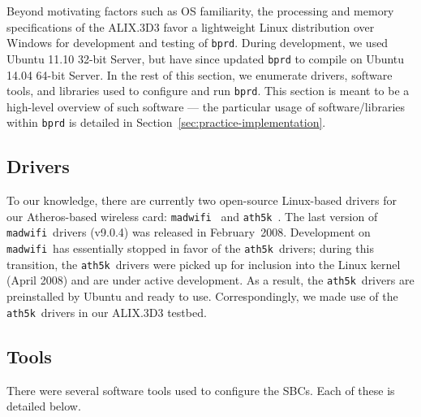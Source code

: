 \documentclass{article}
\newcommand{\athfivek}{\texttt{ath5k}}
\newcommand{\bprd}{\texttt{bprd}\xspace}
\newcommand{\madwifi}{\texttt{madwifi}}
\begin{document}
Beyond motivating factors such as OS familiarity, the processing and memory specifications of the ALIX.3D3 favor a lightweight Linux distribution over Windows for development and testing of \bprd.
During development, we used Ubuntu 11.10 32-bit Server, but have since updated \bprd to compile on Ubuntu 14.04 64-bit Server.
In the rest of this section, we enumerate drivers, software tools, and libraries used to configure and run \bprd.
This section is meant to be a high-level overview of such software --- the particular usage of software/libraries within \bprd is detailed in Section~\ref{sec:practice-implementation}.


\subsection{Drivers}\label{sec:drivers}

To our knowledge, there are currently two open-source Linux-based drivers for our Atheros-based wireless card: \madwifi\ \cite{madwifi} and \athfivek\ \cite{ath5k}.
The last version of \madwifi\ drivers (v9.0.4) was released in February~2008.
Development on \madwifi\ has essentially stopped in favor of the \athfivek\ drivers; during this transition, the \athfivek\ drivers were picked up for inclusion into the Linux kernel (April 2008) \cite{linuxnews} and are under active development.
As a result, the \athfivek\ drivers are preinstalled by Ubuntu and ready to use.
Correspondingly, we made use of the \athfivek\ drivers in our ALIX.3D3 testbed.


\subsection{Tools}\label{sec:tools}

There were several software tools used to configure the SBCs.
Each of these is detailed below.
\end{document}
